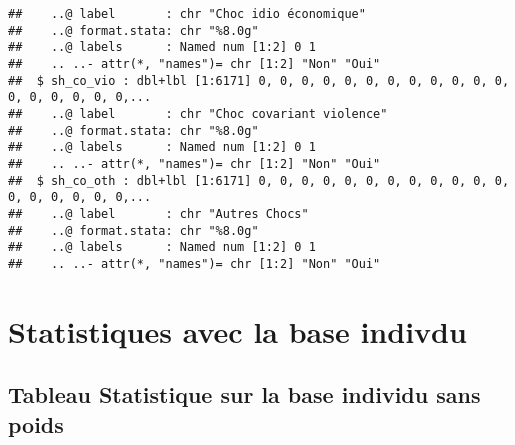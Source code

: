 \documentclass[
]{article}
\begin{document}
\begin{verbatim}
##    ..@ label       : chr "Choc idio économique"
##    ..@ format.stata: chr "%8.0g"
##    ..@ labels      : Named num [1:2] 0 1
##    .. ..- attr(*, "names")= chr [1:2] "Non" "Oui"
##  $ sh_co_vio : dbl+lbl [1:6171] 0, 0, 0, 0, 0, 0, 0, 0, 0, 0, 0, 0, 0, 0, 0, 0, 0, 0,...
##    ..@ label       : chr "Choc covariant violence"
##    ..@ format.stata: chr "%8.0g"
##    ..@ labels      : Named num [1:2] 0 1
##    .. ..- attr(*, "names")= chr [1:2] "Non" "Oui"
##  $ sh_co_oth : dbl+lbl [1:6171] 0, 0, 0, 0, 0, 0, 0, 0, 0, 0, 0, 0, 0, 0, 0, 0, 0, 0,...
##    ..@ label       : chr "Autres Chocs"
##    ..@ format.stata: chr "%8.0g"
##    ..@ labels      : Named num [1:2] 0 1
##    .. ..- attr(*, "names")= chr [1:2] "Non" "Oui"
\end{verbatim}

\section{Statistiques avec la base
indivdu}\label{statistiques-avec-la-base-indivdu}

\subsection{Tableau Statistique sur la base individu sans
poids}\label{tableau-statistique-sur-la-base-individu-sans-poids}
\end{document}

